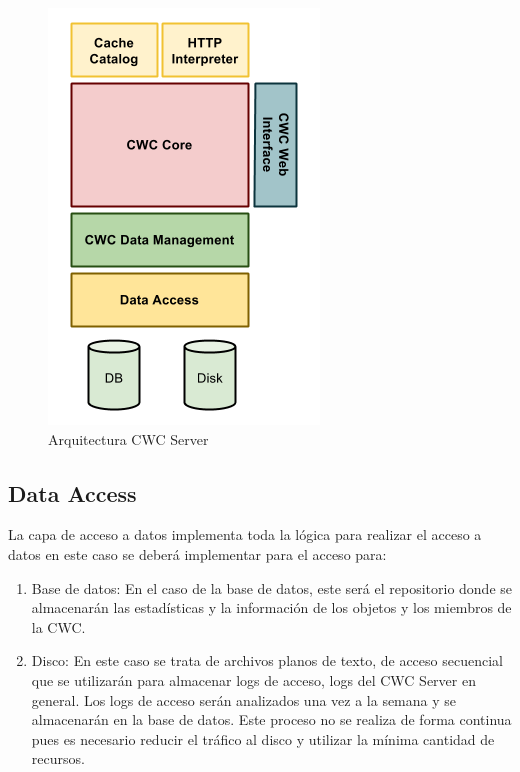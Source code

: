 \begin{figure}[h]
  \centering
    \includegraphics[scale=0.75]{gfx/ArquitecturaCWCServer}
  \caption{Arquitectura CWC Server}
  \label{ArquitecturaCWCServer}
\end{figure}


\subsection{Data Access}

La capa de acceso a datos implementa toda la lógica para realizar el acceso a datos en este caso se deberá implementar para el acceso para:

\begin{enumerate}
\item Base de datos: En el caso de la base de datos, este será el repositorio donde se almacenarán las estadísticas y la información de los objetos y los miembros de la CWC.
\item Disco: En este caso se trata de archivos planos de texto, de acceso secuencial que se utilizarán para almacenar logs de acceso, logs del CWC Server en general. Los logs de acceso serán analizados una vez a la semana y se almacenarán en la base de datos. Este proceso no se realiza de forma continua pues es necesario reducir el tráfico al disco y utilizar la mínima cantidad de recursos.
\end{enumerate}

